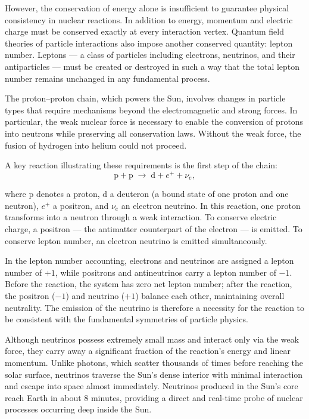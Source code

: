 However, the conservation of energy alone is insufficient to guarantee physical consistency in nuclear reactions. In addition to energy, momentum and electric charge must be conserved exactly at every interaction vertex. Quantum field theories of particle interactions also impose another conserved quantity: lepton number. Leptons — a class of particles including electrons, neutrinos, and their antiparticles — must be created or destroyed in such a way that the total lepton number remains unchanged in any fundamental process.

The proton–proton chain, which powers the Sun, involves changes in particle types that require mechanisms beyond the electromagnetic and strong forces. In particular, the weak nuclear force is necessary to enable the conversion of protons into neutrons while preserving all conservation laws. Without the weak force, the fusion of hydrogen into helium could not proceed.

A key reaction illustrating these requirements is the first step of the chain:
\[
\text{p} + \text{p} \;\to\; \text{d} + e^+ + \nu_e,
\]

where $\text{p}$ denotes a proton, $\text{d}$ a deuteron (a bound state of one proton and one neutron), $e^+$ a positron, and $\nu_e$ an electron neutrino. In this reaction, one proton transforms into a neutron through a weak interaction. To conserve electric charge, a positron — the antimatter counterpart of the electron — is emitted. To conserve lepton number, an electron neutrino is emitted simultaneously. 

In the lepton number accounting, electrons and neutrinos are assigned a lepton number of $+1$, while positrons and antineutrinos carry a lepton number of $-1$. Before the reaction, the system has zero net lepton number; after the reaction, the positron ($-1$) and neutrino ($+1$) balance each other, maintaining overall neutrality. The emission of the neutrino is therefore a necessity for the reaction to be consistent with the fundamental symmetries of particle physics.

Although neutrinos possess extremely small mass and interact only via the weak force, they carry away a significant fraction of the reaction's energy and linear momentum. Unlike photons, which scatter thousands of times before reaching the solar surface, neutrinos traverse the Sun's dense interior with minimal interaction and escape into space almost immediately. Neutrinos produced in the Sun's core reach Earth in about 8 minutes, providing a direct and real-time probe of nuclear processes occurring deep inside the Sun.

